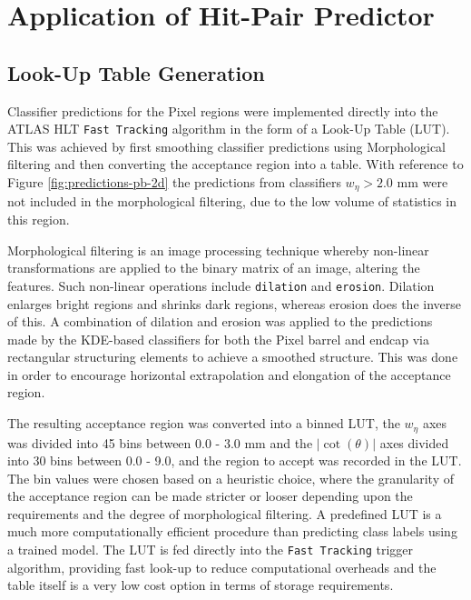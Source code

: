 \section{Application of Hit-Pair Predictor}
\label{application-of-hit-pair-predictor}

\subsection{Look-Up Table Generation}
\label{LUT-generation}

Classifier predictions for the Pixel regions were implemented directly into the ATLAS HLT \texttt{Fast Tracking} algorithm in the form of a Look-Up Table (LUT). This was achieved by first smoothing classifier predictions using Morphological filtering \cite{morphological-filtering} and then converting the acceptance region into a table. With reference to Figure \ref{fig:predictions-pb-2d} the predictions from classifiers $w_{\eta} > 2.0$ mm were not included in the morphological filtering, due to the low volume of statistics in this region. 

Morphological filtering is an image processing technique whereby non-linear transformations are applied to the binary matrix of an image, altering the features. Such non-linear operations include \texttt{dilation} and \texttt{erosion}. Dilation enlarges bright regions and shrinks dark regions, whereas erosion does the inverse of this. A combination of dilation and erosion was applied to the predictions made by the KDE-based classifiers for both the Pixel barrel and endcap via rectangular structuring elements to achieve a smoothed structure. This was done in order to encourage horizontal extrapolation and elongation of the acceptance region.

The resulting acceptance region was converted into a binned LUT, the $w_{\eta}$ axes was divided into 45 bins between 0.0 - 3.0 mm and the $\lvert \cot(\theta) \rvert$ axes divided into 30 bins between 0.0 - 9.0, and the region to accept was recorded in the LUT. The bin values were chosen based on a heuristic choice, where the granularity of the acceptance region can be made stricter or looser depending upon the requirements and the degree of morphological filtering. A predefined LUT is a much more computationally efficient procedure than predicting class labels using a trained model. The LUT is fed directly into the \texttt{Fast Tracking} trigger algorithm, providing fast look-up to reduce computational overheads and the table itself is a very low cost option in terms of storage requirements. 



